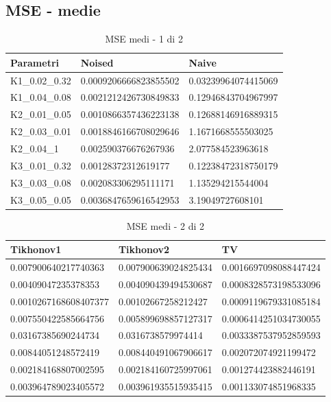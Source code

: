 \documentclass[12pt]{article}
\begin{document}
    \subsection{MSE - medie}

    \begin{table}[!ht]
    \centering
    \begin{tabular}{|l|l|l|}
    \hline
        Parametri & Noised & Naive \\ \hline
        K1\_0.02\_0.32 & 0.0009206666823855502 & 0.03239964074415069 \\ \hline
        K1\_0.04\_0.08 & 0.0021212426730849833 & 0.12946843704967997 \\ \hline
        K2\_0.01\_0.05 & 0.0010866357436223138 & 0.12688146916889315 \\ \hline
        K2\_0.03\_0.01 & 0.0018846166708029646 & 1.1671668555503025 \\ \hline
        K2\_0.04\_1 & 0.002590376676267936 & 2.077584523963618 \\ \hline
        K3\_0.01\_0.32 & 0.00128372312619177 & 0.12238472318750179 \\ \hline
        K3\_0.03\_0.08 & 0.002083306295111171 & 1.135294215544004 \\ \hline
        K3\_0.05\_0.05 & 0.0036847659616542953 & 3.19049727608101 \\ \hline
    \end{tabular}
    \caption{MSE medi - 1 di 2}
    \label{table:10}
    \end{table}

    \begin{table}[!ht]
    \centering
    \begin{tabular}{|l|l|l|}
    \hline
        Tikhonov1 & Tikhonov2 & TV \\ \hline
        0.007900640217740363 & 0.007900639024825434 & 0.0016697098088447424 \\ \hline
        0.00409047235378353 & 0.004090439494530687 & 0.0008328573198533096 \\ \hline
        0.0010267168608407377 & 0.00102667258212427 & 0.0009119679331085184 \\ \hline
        0.007550422585664756 & 0.005899698857127317 & 0.0006414251034730055 \\ \hline
        0.03167385690244734 & 0.0316738579974414 & 0.0033387537952859593 \\ \hline
        0.00844051248572419 & 0.008440491067906617 & 0.002072074921199472 \\ \hline
        0.002184168807002595 & 0.002184160725997061 & 0.001274423882446191 \\ \hline
        0.003964789023405572 & 0.003961935515935415 & 0.001133074851968335 \\ \hline
    \end{tabular}
    \caption{MSE medi - 2 di 2}
    \label{table:11}
    \end{table}
\end{document}
